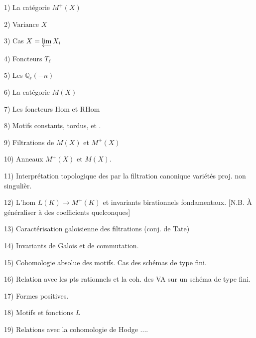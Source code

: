 \hfill{} %

1) La catégorie $M^+(X)$ %

2) Variance  $X$ %

3) Cas $X=\varprojlim X_i$ %

4) Foncteurs $T_\ell$ %

5) Les $\mathbb Q_\ell(-n)$ %

6) La catégorie $M(X)$ %

7) Les foncteurs $\mathrm{Hom}$ et $\mathrm{RHom}$ %

8) Motifs constants, tordus, et . %

9) Filtrations de $M(X)$ et $M^+(X)$ %

10) Anneaux $M^+(X)$ et $M(X)$. %

11) Interprétation topologique des   %
par la filtration canonique  variétés proj. non singulièr. %

12) L'hom $L(K)\to M^+(K)$ et invariants birationnels fondamentaux. %
[N.B. À généraliser à des coefficients quelconques] %

13) Caractérisation galoisienne des filtrations (conj. de Tate) %

14) Invariants de Galois et  de commutation. %

15) Cohomologie absolue des motifs. Cas des schémas de type fini. %

16) Relation avec les pts rationnels et la coh. des VA sur %
un schéma de type fini. %

17) Formes positives. %

18) Motifs et fonctions $L$ %

19) Relations avec la cohomologie de Hodge ....  %

